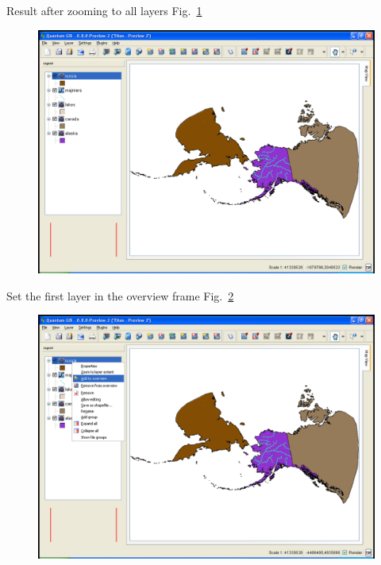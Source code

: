 Result after zooming to all layers Fig.~\ref{fig:qgis005}

\begin{figure}[htbp]
   \centering
   \includegraphics[scale=0.2]{qgis005.png}
   \caption{}
   \label{fig:qgis005}
\end{figure}

Set the first layer in the overview frame Fig.~\ref{fig:qgis006}

\begin{figure}[htbp]
   \centering
   \includegraphics[scale=0.2]{qgis006.png}
   \caption{}
   \label{fig:qgis006}
\end{figure}

